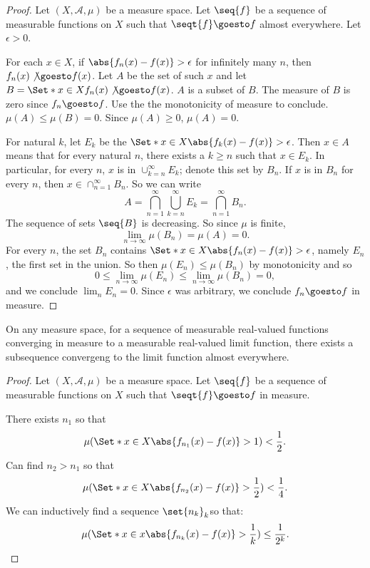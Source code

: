 \begin{proof}Let $(X, \mathcal{A} , \mu )$ be a measure space.
Let $\seq{f}$ be a sequence of measurable functions on $X$ such that $\seqt{f} \goesto f$ almost everywhere.
Let $\epsilon  > 0$.

For each $x \in X$, if $\abs{f_n(x) - f(x)} > \epsilon $ for infinitely many $n$, then $f_n(x) \not\goesto f(x)$.
Let $A$ be the set of such $x$ and let $B = \Set*{ x \in X }{ f_n(x) \not\goesto f(x) }$.
$A$ is a subset of $B$.
The measure of $B$ is zero since $f_n \goesto f$.
Use the the monotonicity of measure to conclude.
$\mu (A) \leq \mu (B) = 0$.
Since $\mu (A) \geq 0$,
$\mu (A) = 0$.

For natural $k$, let $E_k$ be the $\Set*{x \in X} {\abs{f_k(x) - f(x)} > \epsilon }$.
Then $x \in A$ means that for every natural $n$, there exists a $k \geq n$ such that $x \in E_k$.
In particular, for every $n$, $x$ is in $\cup_{k = n}^{\infty}E_k$;
denote this set by $B_n$.
If $x$ is in $B_n$ for every
$n$, then
$x \in \cap _{n = 1}^{\infty} B_n$.
So we can write
\[
A = \bigcap_{n = 1}^{\infty}
\bigcup_{k = n}^{\infty}
E_k
= \bigcap_{n = 1}^{\infty}
B_n
.
\]
The sequence of sets $\seq{B}$ is decreasing. So since $\mu $ is finite,
\[
\lim_{n \to \infty} \mu (B_n) = \mu (A) = 0.
\]
For every $n$, the set $B_n$ contains $\Set*{x \in X}{\abs{f_n(x) - f(x)} > \epsilon }$, namely $E_n$, the first set in the union.
So then $\mu (E_n) \leq \mu (B_n)$ by monotonicity and so
\[
0
\leq \lim_{n \to \infty} \mu (E_n)
\leq \lim_{n \to \infty} \mu (B_n)
= 0,
\]
and we conclude $\lim_{n} E_n = 0$.
Since $\epsilon $ was arbitrary,
we conclude $f_n \goesto f$ in
measure.
\end{proof}
\begin{proposition}
On any measure space,
for a sequence
of measurable real-valued
functions converging
in measure to a measurable
real-valued limit function,
there exists a subsequence
convergeng to the limit
function almost everywhere.
\end{proposition}

\begin{proof}Let $(X, \mathcal{A} , \mu )$ be a measure space.
Let $\seq{f}$ be a sequence of measurable functions on $X$ such that $\seqt{f} \goesto f$ in measure.

There exists $n_1$ so that
\[
\mu (\Set*{x \in X}{\abs{f_{n_1}(x) - f(x)} > 1}) < \frac{1}{2}.
\]
Can find $n_2 > n_1$ so that
\[
\mu (\Set*{x \in X}{\abs{f_{n_2}(x) - f(x)} > \frac{1}{2}}) < \frac{1}{4}.
\]
We can inductively find a sequence $\set{n_k}_k$so that:
\[
\mu (\Set*{
x \in x
}{
\abs{f_{n_k}(x) - f(x)} > \frac{1}{k}
}) \leq \frac{1}{2^k}.
\]
\end{proof}